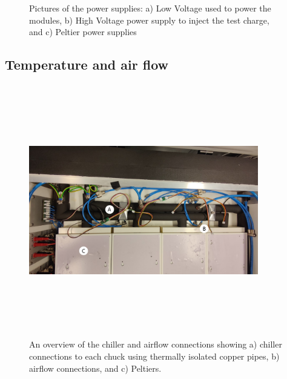 \begin{figure}[h]
    \caption{Pictures of the power supplies: a) Low Voltage used to power the modules, b) High Voltage power supply to inject the test charge, and c) Peltier power supplies}
    \label{fig:supplies}
\end{figure}
\newpage
\subsection{Temperature and air flow}
\begin{figure}[h]
    \centering
    \includegraphics[width=10cm,height=11cm,keepaspectratio]{Figures/test/connections-2.jpg}
    \caption{An overview of the chiller and airflow connections showing a) chiller connections to each chuck using thermally isolated copper pipes, b) airflow connections, and c) Peltiers.}
    \label{fig:cooling}
\end{figure}
